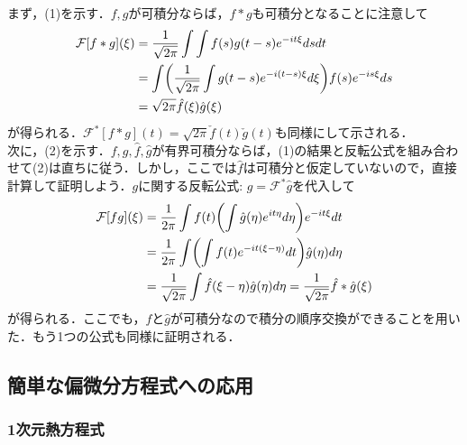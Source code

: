 \documentclass[dvipdfmx,a4j,10pt]{jsarticle}
\makeatletter
\theoremstyle{mystyle1}
\theoremstyle{mystyle3}
\theoremstyle{mystyle4}
\theoremstyle{mystyle6}
\theoremstyle{mystyle2}
\theoremstyle{mystyle5}
\renewenvironment{proof}[1][\proofname]{\par
  \pushQED{\qed}%
  \normalfont
  \topsep6\p@\@plus6\p@ \trivlist
  \item[\hskip\labelsep{\bfseries\sffamily #1}]\ignorespaces
}{%
  \popQED\endtrivlist\@endpefalse
}
\renewcommand\proofname{証明}
\makeatother
\begin{document}
\begin{proof}
	まず，(1)を示す．$f, g$が可積分ならば，$f*g$も可積分となることに注意して
	\[
		\begin{split}
			\mathcal{F}[f*g](\xi)&=\frac{1}{\sqrt{2\pi}}\int\int f(s)g(t-s)e^{-it\xi}dsdt \\
			&=\int\mleft(\frac{1}{\sqrt{2\pi}}\int g(t-s)e^{-i(t-s)\xi}d\xi\mright)f(s)e^{-is\xi}ds \\
			&=\sqrt{2\pi}\hat{f}(\xi)\hat{g}(\xi)
		\end{split}
	\]
	が得られる．$\mathcal{F}^*[f*g](t)=\sqrt{2\pi}\check{f}(t)\check{g}(t)$も同様にして示される．\\
	次に，(2)を示す．$f, g, \hat{f}, \hat{g}$が有界可積分ならば，(1)の結果と反転公式を組み合わせて(2)は直ちに従う．しかし，ここでは$\hat{f}$は可積分と仮定していないので，直接計算して証明しよう．$g$に関する反転公式: $g=\mathcal{F}^*\hat{g}$を代入して
	\[
		\begin{split}
			\mathcal{F}[fg](\xi)&=\frac{1}{2\pi}\int f(t)\mleft(\int\hat{g}(\eta)e^{it\eta}d\eta\mright)e^{-it\xi}dt \\
			&=\frac{1}{2\pi}\int\mleft(\int f(t)e^{-it(\xi-\eta)}dt\mright)\hat{g}(\eta)d\eta \\
			&=\frac{1}{\sqrt{2\pi}}\int\hat{f}(\xi-\eta)\hat{g}(\eta)d\eta=\frac{1}{\sqrt{2\pi}}\hat{f}*\hat{g}(\xi)
		\end{split}
	\]
	が得られる．ここでも，$f$と$\hat{g}$が可積分なので積分の順序交換ができることを用いた．もう1つの公式も同様に証明される．
\end{proof}

\subsection{簡単な偏微分方程式への応用}

\subsubsection{1次元熱方程式}
\end{document}
